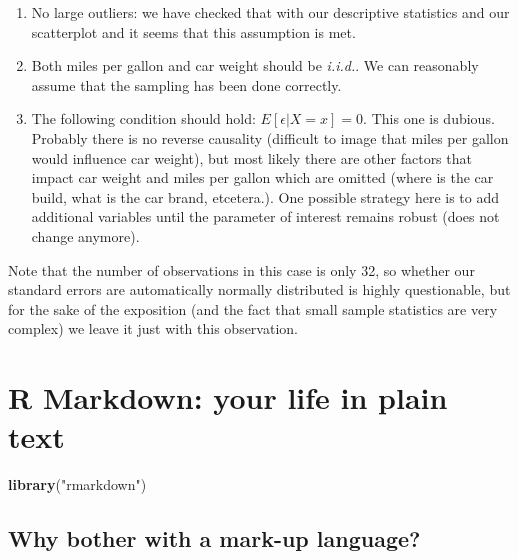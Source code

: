 \documentclass[]{article}
\newenvironment{Shaded}{\begin{snugshade}}{\end{snugshade}}
\newcommand{\KeywordTok}[1]{\textcolor[rgb]{0.13,0.29,0.53}{\textbf{{#1}}}}
\newcommand{\StringTok}[1]{\textcolor[rgb]{0.31,0.60,0.02}{{#1}}}
\newcommand{\NormalTok}[1]{{#1}}
\theoremstyle{definition}
\theoremstyle{definition}
\theoremstyle{definition}
\theoremstyle{remark}
\begin{document}
\begin{enumerate}
\def\labelenumi{\arabic{enumi}.}
\item
  No large outliers: we have checked that with our descriptive
  statistics and our scatterplot and it seems that this assumption is
  met.
\item
  Both miles per gallon and car weight should be \emph{i.i.d.}. We can
  reasonably assume that the sampling has been done correctly.
\item
  The following condition should hold: \(E[\epsilon|X=x] = 0\). This one
  is dubious. Probably there is no reverse causality (difficult to image
  that miles per gallon would influence car weight), but most likely
  there are other factors that impact car weight and miles per gallon
  which are omitted (where is the car build, what is the car brand,
  etcetera.). One possible strategy here is to add additional variables
  until the parameter of interest remains robust (does not change
  anymore).
\end{enumerate}

Note that the number of observations in this case is only 32, so whether
our standard errors are automatically normally distributed is highly
questionable, but for the sake of the exposition (and the fact that
small sample statistics are very complex) we leave it just with this
observation.

\section{R Markdown: your life in plain
text}\label{r-markdown-your-life-in-plain-text}

\begin{Shaded}
\begin{Highlighting}[]
\KeywordTok{library}\NormalTok{(}\StringTok{"rmarkdown"}\NormalTok{)}
\end{Highlighting}
\end{Shaded}

\subsection{Why bother with a mark-up
language?}\label{why-bother-with-a-mark-up-language}
\end{document}
